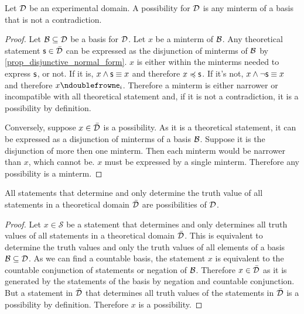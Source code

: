 \documentclass[11pt,letterpaper,fleqn]{memoir} %
\begin{document}
\begin{mathSection}
	
\begin{prop}\label{prop_poss_is_minterm}
	Let $\mathcal{D}$ be an experimental domain. A possibility for $\mathcal{D}$ is any minterm of a basis that is not a contradiction.
\end{prop}

\begin{proof}
	Let $\mathcal{B} \subseteq \mathcal{D}$ be a basis for $\mathcal{D}$. Let $x$ be a minterm of $\mathcal{B}$. Any theoretical statement $\mathsf{s} \in \bar{\mathcal{D}}$ can be expressed as the disjunction of minterms of $\mathcal{B}$ by \ref{prop_disjunctive_normal_form}. $x$ is either within the minterms needed to express $\mathsf{s}$, or not. If it is, $x \wedge \mathsf{s} \equiv x$ and therefore $x \preccurlyeq \mathsf{s}$. If it's not, $x \wedge \neg \mathsf{s} \equiv x$ and therefore $x \ncomp \obs[e]_i$. Therefore a minterm is either narrower or incompatible with all theoretical statement and, if it is not a contradiction, it is a possibility by definition.
	
	Conversely, suppose $x \in \bar{\mathcal{D}}$ is a possibility. As it is a theoretical statement, it can be expressed as a disjunction of minterms of a basis $\mathcal{B}$. Suppose it is the disjunction of more then one minterm. Then each minterm would be narrower than $x$, which cannot be. $x$ must be expressed by a single minterm. Therefore any possibility is a minterm.
\end{proof}

\begin{prop}
	All statements that determine and only determine the truth value of all statements in a theoretical domain $\bar{\mathcal{D}}$ are possibilities of $\mathcal{D}$.
\end{prop}

\begin{proof}
	Let $x \in \mathcal{S}$ be a statement that determines and only determines all truth values of all statements in a theoretical domain $\bar{\mathcal{D}}$. This is equivalent to determine the truth values and only the truth values of all elements of a basis $\mathcal{B} \subseteq \mathcal{D}$. As we can find a countable basis, the statement $x$ is equivalent to the countable conjunction of statements or negation of $\mathcal{B}$. Therefore $x \in \bar{\mathcal{D}}$ as it is generated by the statements of the basis by negation and countable conjunction. But a statement in $\bar{\mathcal{D}}$ that determines all truth values of the statements in $\bar{\mathcal{D}}$ is a possibility by definition. Therefore $x$ is a possibility.
\end{proof}
\end{mathSection}
\end{document}
